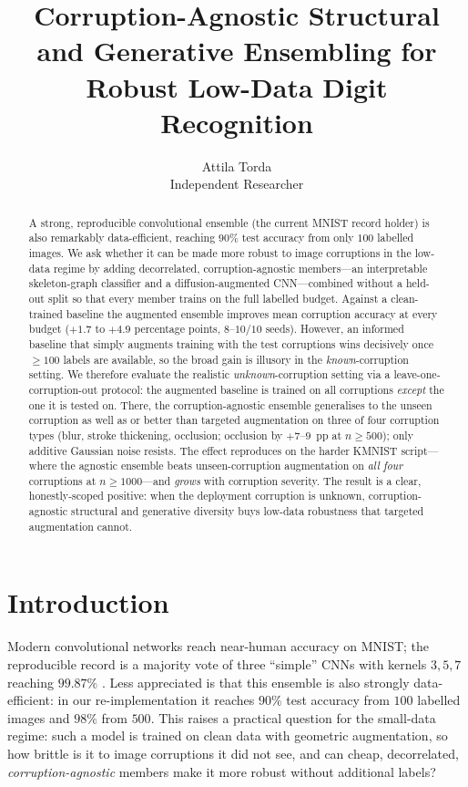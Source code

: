 \documentclass{article}
\title{Corruption-Agnostic Structural and Generative Ensembling for\\
       Robust Low-Data Digit Recognition}
\author{%
  Attila Torda \\
  Independent Researcher
}
\begin{document}
\maketitle

\begin{abstract}
A strong, reproducible convolutional ensemble (the current MNIST record holder) is also
remarkably data-efficient, reaching $90\%$ test accuracy from only $100$ labelled images.
We ask whether it can be made more robust to image corruptions in the low-data regime by
adding decorrelated, corruption-agnostic members---an interpretable skeleton-graph
classifier and a diffusion-augmented CNN---combined without a held-out split so that every
member trains on the full labelled budget. Against a clean-trained baseline the augmented
ensemble improves mean corruption accuracy at every budget ($+1.7$ to $+4.9$ percentage
points, $8$--$10/10$ seeds). However, an informed baseline that simply augments training
with the test corruptions wins decisively once $\geq\!100$ labels are available, so the
broad gain is illusory in the \emph{known}-corruption setting. We therefore evaluate the
realistic \emph{unknown}-corruption setting via a leave-one-corruption-out protocol: the
augmented baseline is trained on all corruptions \emph{except} the one it is tested on.
There, the corruption-agnostic ensemble generalises to the unseen corruption as well as or
better than targeted augmentation on three of four corruption types (blur, stroke
thickening, occlusion; occlusion by $+7$--$9$~pp at $n\!\geq\!500$); only additive Gaussian
noise resists. The effect reproduces on the harder KMNIST script---where the agnostic ensemble
beats unseen-corruption augmentation on \emph{all four} corruptions at $n\!\geq\!1000$---and
\emph{grows} with corruption severity. The result is a clear, honestly-scoped positive: when the
deployment corruption is unknown, corruption-agnostic structural and generative diversity buys
low-data robustness that targeted augmentation cannot.
\end{abstract}

\section{Introduction}
Modern convolutional networks reach near-human accuracy on MNIST; the reproducible record is
a majority vote of three ``simple'' CNNs with kernels $3,5,7$ reaching $99.87\%$
\cite{An2020}. Less appreciated is that this ensemble is also strongly data-efficient: in our
re-implementation it reaches $90\%$ test accuracy from $100$ labelled images and $98\%$ from
$500$. This raises a practical question for the small-data regime: such a model is trained on
clean data with geometric augmentation, so how brittle is it to image corruptions it did not
see, and can cheap, decorrelated, \emph{corruption-agnostic} members make it more robust
without additional labels?
\end{document}
